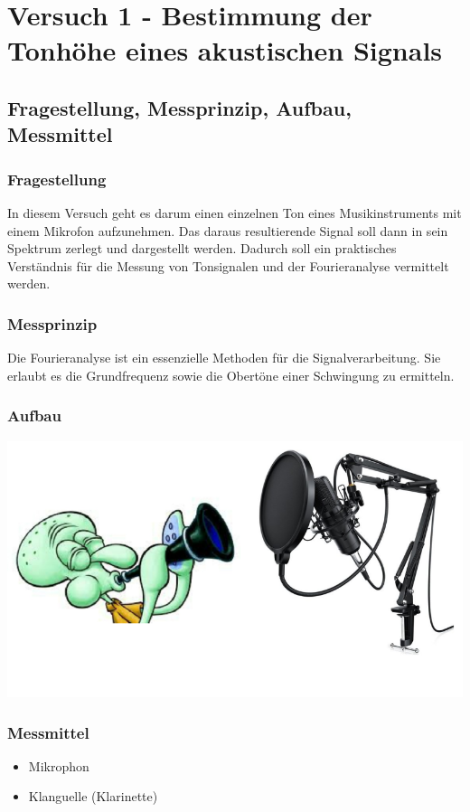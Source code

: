 \chapter{Versuch 1 - Bestimmung der Tonhöhe eines akustischen Signals}
\label{chap:VERSUCH_1}


\section{Fragestellung, Messprinzip, Aufbau, Messmittel}
\label{chap:VERSUCH_1_FRAGESTELLUNG}

\subsection*{Fragestellung}
	In diesem Versuch geht es darum einen einzelnen Ton eines Musikinstruments mit einem Mikrofon aufzunehmen.
Das daraus resultierende Signal soll dann in sein Spektrum zerlegt und dargestellt werden.
Dadurch soll ein praktisches Verständnis für die Messung von Tonsignalen und der Fourieranalyse vermittelt werden.
	
\subsection*{Messprinzip}
Die Fourieranalyse ist ein essenzielle Methoden für die Signalverarbeitung. Sie erlaubt es die Grundfrequenz sowie die Obertöne einer Schwingung zu ermitteln.

\subsection*{Aufbau}

\includegraphics[scale=0.4]{media/Versuchaufbau.png}
\label{Abb:Aufbau}


\subsection*{Messmittel}
\begin{itemize}
	\item Mikrophon
	\item Klanguelle (Klarinette)
\end{itemize}

